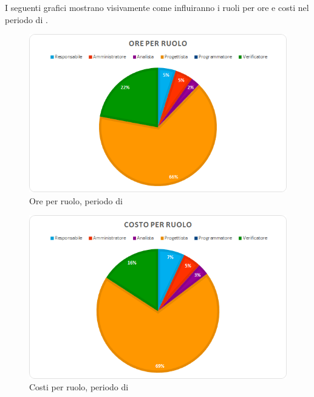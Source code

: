 I seguenti grafici mostrano visivamente come influiranno i ruoli per ore e costi nel periodo di \PD{}.
\begin{figure}[H]
	\centering
	\includegraphics[width=14cm]{img_peconomico/PD2_OR.png}
	\caption{Ore per ruolo, periodo di \PD}
\end{figure}
\begin{figure}[H]
	\centering
	\includegraphics[width=14cm]{img_peconomico/PD2_CR.png}
	\caption{Costi per ruolo, periodo di \PD}
\end{figure}

